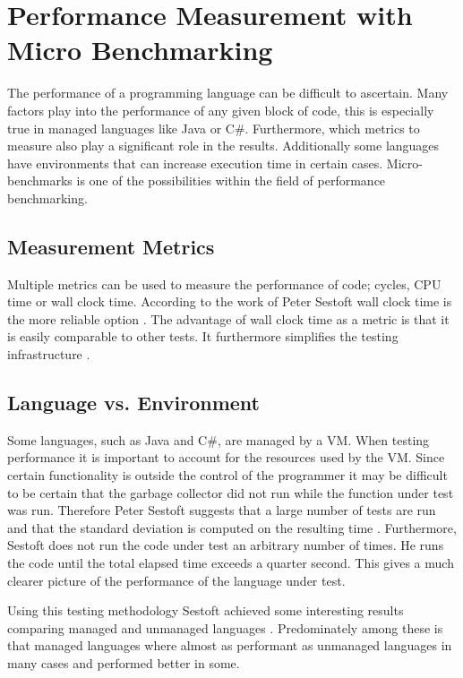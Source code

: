 \section{Performance Measurement with Micro Benchmarking} \label{sec:micro-benchmarking}
The performance of a programming language can be difficult to ascertain. Many factors play into the performance of any given block of code, this is especially true in managed languages like Java or C\#. Furthermore, which metrics to measure also play a significant role in the results. Additionally some languages have environments that can increase execution time in certain cases. Micro-benchmarks is one of the possibilities within the field of performance benchmarking.

\subsection{Measurement Metrics}
Multiple metrics can be used to measure the performance of code; cycles, \ac{CPU} time or wall clock time. According to the work of Peter Sestoft wall clock time is the more reliable option \cite{sestoft2013microbenchmarks}. The advantage of wall clock time as a metric is that it is easily comparable to other tests. It furthermore simplifies the testing infrastructure \cite{sestoft2013microbenchmarks}.

\subsection{Language vs. Environment}
Some languages, such as Java and C\#, are managed by a \ac{VM}. When testing performance it is important to account for the resources used by the \ac{VM}. Since certain functionality is outside the control of the programmer it may be difficult to be certain that the garbage collector did not run while the function under test was run. Therefore Peter Sestoft suggests that a large number of tests are run and that the standard deviation is computed on the resulting time \cite{sestoft2013microbenchmarks}. Furthermore, Sestoft does not run the code under test an arbitrary number of times. He runs the code until the total elapsed time exceeds a quarter second. This gives a much clearer picture of the performance of the language under test.

Using this testing methodology Sestoft achieved some interesting results comparing managed and unmanaged languages \cite{sestoft2010numeric}. Predominately among these is that managed languages where almost as performant as unmanaged languages in many cases and performed better in some.

